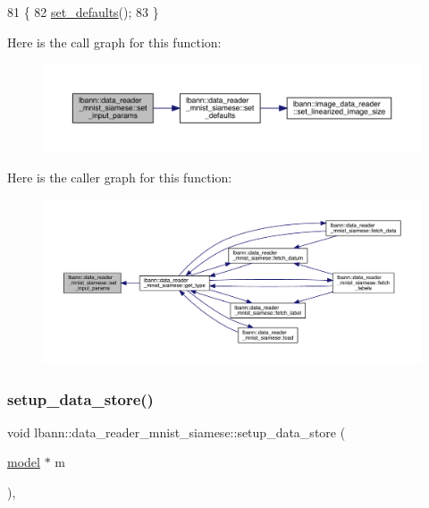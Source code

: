 \begin{DoxyCode}
81                                               \{
82   \hyperlink{classlbann_1_1data__reader__mnist__siamese_a7e1c9530b5d56a0835db8a30af980164}{set\_defaults}();
83 \}
\end{DoxyCode}
Here is the call graph for this function\+:\nopagebreak
\begin{figure}[H]
\begin{center}
\leavevmode
\includegraphics[width=350pt]{classlbann_1_1data__reader__mnist__siamese_abe572754f0b1415407c1b698b0f83656_cgraph}
\end{center}
\end{figure}
Here is the caller graph for this function\+:\nopagebreak
\begin{figure}[H]
\begin{center}
\leavevmode
\includegraphics[width=350pt]{classlbann_1_1data__reader__mnist__siamese_abe572754f0b1415407c1b698b0f83656_icgraph}
\end{center}
\end{figure}
\mbox{\label{classlbann_1_1data__reader__mnist__siamese_a410d8aa510fb2f3f4d1a257d5b308819}} 
\subsubsection{\texorpdfstring{setup\+\_\+data\+\_\+store()}{setup\_data\_store()}}
{\footnotesize\ttfamily void lbann\+::data\+\_\+reader\+\_\+mnist\+\_\+siamese\+::setup\+\_\+data\+\_\+store (\begin{DoxyParamCaption}\item[{\hyperlink{classlbann_1_1model}{model} $\ast$}]{m }\end{DoxyParamCaption})\hspace{0.3cm}{\ttfamily [override]}, {\ttfamily [virtual]}}



